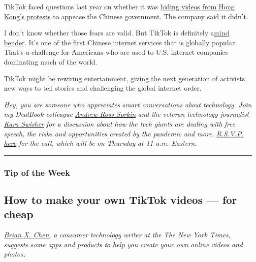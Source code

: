 TikTok faced questions last year on whether it was
\href{https://www.bloomberg.com/news/newsletters/2019-09-17/hong-kong-protests-raise-censorship-concerns-for-hot-app-tiktok?sref=7ooTCNG1}{hiding
videos from Hong Kong's protests} to appease the Chinese government. The
company said it didn't.

I don't know whether those fears are valid. But TikTok is definitely
a\href{https://www.nytimes3xbfgragh.onion/2019/11/05/business/tiktok-china-bytedance.html}{mind
bender}. It's one of the first Chinese internet services that is
globally popular. That's a challenge for Americans who are used to U.S.
internet companies dominating much of the world.

TikTok might be rewiring entertainment, giving the next generation of
activists new ways to tell stories and challenging the global internet
order.

\emph{Hey, you are someone who appreciates smart conversations about
technology. Join my DealBook colleague}
\href{https://www.nytimes3xbfgragh.onion/by/andrew-ross-sorkin}{\emph{Andrew
Ross Sorkin}} \emph{and the veteran technology journalist}
\href{https://www.nytimes3xbfgragh.onion/column/kara-swisher}{\emph{Kara
Swisher}} \emph{for a discussion about how the tech giants are dealing
with free speech, the risks and opportunities created by the pandemic
and more.}
\href{https://timesevents.nytimes3xbfgragh.onion/dealbookdebrief0604}{\emph{R.S.V.P.
here}} \emph{for the call, which will be on Thursday at 11 a.m.
Eastern.}

\begin{center}\rule{0.5\linewidth}{\linethickness}\end{center}

\hypertarget{tip-of-the-week}{%
\subsubsection{Tip of the Week}\label{tip-of-the-week}}

\hypertarget{how-to-make-your-own-tiktok-videos--for-cheap}{%
\subsection{How to make your own TikTok videos --- for
cheap}\label{how-to-make-your-own-tiktok-videos--for-cheap}}

\href{https://www.nytimes3xbfgragh.onion/by/brian-x-chen}{\emph{Brian X.
Chen}}\emph{, a consumer technology writer at the The New York Times,
suggests some apps and products to help you create your own online
videos and photos.}

